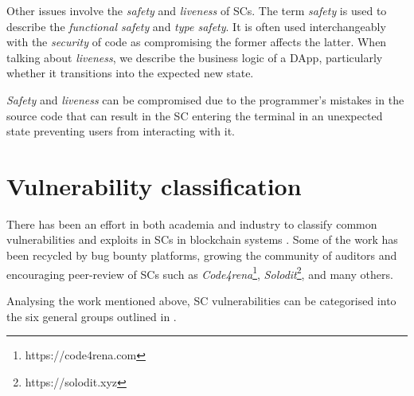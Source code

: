 \documentclass[oneside]{ecsproject}     %
\begin{document}
Other issues involve the \textit{safety} and \textit{liveness} of SCs. 
The term \textit{safety} is used to describe the \textit{functional safety} and \textit{type safety}. It is often used interchangeably with the \textit{security} of code
as compromising the former affects the latter. When talking about \textit{liveness}, we describe the business logic of a DApp, particularly whether it transitions into the expected new state.

\textit{Safety} and \textit{liveness} can be compromised due to the programmer's mistakes in the source code that can result in the SC entering the terminal in an unexpected state
preventing users from interacting with it\cite{ondo_report}.


\section{Vulnerability classification}

There has been an effort in both academia and industry to classify common vulnerabilities 
and exploits in SCs in blockchain systems \cite{owasp}\cite{stefano}\cite{atzei_survey}. 
Some of the work has been recycled by bug bounty platforms, growing the community of auditors
and encouraging peer-review of SCs such as \textit{Code4rena}\footnote{https://code4rena.com}, \textit{Solodit}\footnote{https://solodit.xyz},
and many others.

Analysing the work mentioned above, SC vulnerabilities can be categorised into the six general groups outlined in .
\end{document}
